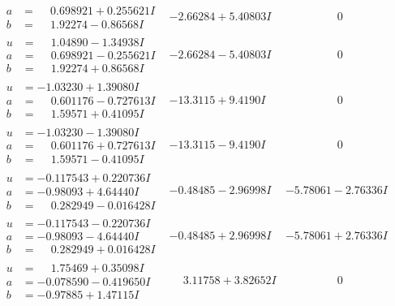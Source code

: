\documentclass[1p]{elsarticle_modified}
\theoremstyle{definition}
\begin{document}
$$\begin{array}{c|c|c}
\begin{aligned}
a &= \phantom{-}0.698921 + 0.255621 I \\
b &= \phantom{-}1.92274 - 0.86568 I\end{aligned}
 & -2.66284 + 5.40803 I & \phantom{-0.000000 } 0 \\ \hline\begin{aligned}
u &= \phantom{-}1.04890 - 1.34938 I \\
a &= \phantom{-}0.698921 - 0.255621 I \\
b &= \phantom{-}1.92274 + 0.86568 I\end{aligned}
 & -2.66284 - 5.40803 I & \phantom{-0.000000 } 0 \\ \hline\begin{aligned}
u &= -1.03230 + 1.39080 I \\
a &= \phantom{-}0.601176 - 0.727613 I \\
b &= \phantom{-}1.59571 + 0.41095 I\end{aligned}
 & -13.3115 + 9.4190 I & \phantom{-0.000000 } 0 \\ \hline\begin{aligned}
u &= -1.03230 - 1.39080 I \\
a &= \phantom{-}0.601176 + 0.727613 I \\
b &= \phantom{-}1.59571 - 0.41095 I\end{aligned}
 & -13.3115 - 9.4190 I & \phantom{-0.000000 } 0 \\ \hline\begin{aligned}
u &= -0.117543 + 0.220736 I \\
a &= -0.98093 + 4.64440 I \\
b &= \phantom{-}0.282949 - 0.016428 I\end{aligned}
 & -0.48485 - 2.96998 I & -5.78061 - 2.76336 I \\ \hline\begin{aligned}
u &= -0.117543 - 0.220736 I \\
a &= -0.98093 - 4.64440 I \\
b &= \phantom{-}0.282949 + 0.016428 I\end{aligned}
 & -0.48485 + 2.96998 I & -5.78061 + 2.76336 I \\ \hline\begin{aligned}
u &= \phantom{-}1.75469 + 0.35098 I \\
a &= -0.078590 - 0.419650 I \\
b &= -0.97885 + 1.47115 I\end{aligned}
 & \phantom{-}3.11758 + 3.82652 I & \phantom{-0.000000 } 0 \\ \hline\begin{aligned}

\end{aligned}
\end{array}$$
\end{document}

